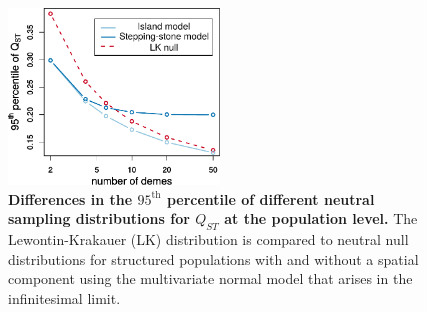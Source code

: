 \begin{figure}
  \centering
  \includegraphics[width=0.5\textwidth]{./figures/qst_deme_percentile_nospace_alt.pdf}
  \caption{\textbf{Differences in the $95^{\mathrm{th}}$ percentile of different
      neutral sampling distributions for $Q_{ST}$ at the population level.} The
    Lewontin-Krakauer (LK) distribution is compared to neutral null
    distributions for structured populations with and without a spatial
    component using the multivariate normal model that arises in the
    infinitesimal limit.}
  \label{fig:qst_perc}
\end{figure}




